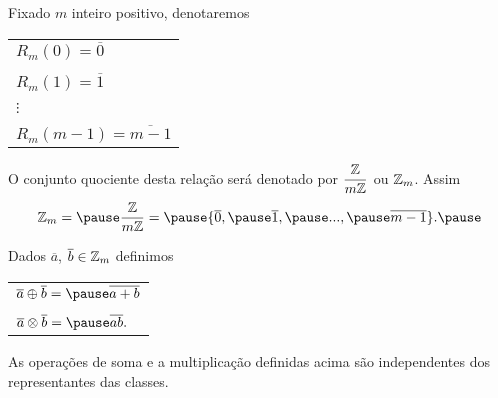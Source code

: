 \documentclass{beamer}
\begin{document}
    \begin{frame}
        \begin{observacao}
        Fixado $m$ inteiro positivo, \pause denotaremos\pause
        \begin{center}
            \begin{tabular}{l}
                $R_{m}(0) = \overline{0}$\pause \\
                \\
                $R_{m}(1) = \overline{1}$\pause \\
                \\
                $\vdots$\\
                \\
                $R_{m}(m-1) = \overline{m-1}$\pause
            \end{tabular}
        \end{center}

        O conjunto quociente \pause desta relação será denotado por $\displaystyle\frac{\mathbb{Z}}{m\mathbb{Z}}$ \pause ou $\mathbb{Z}_m$. \pause Assim\pause
        \[
            \z_m = \pause \displaystyle\frac{\z}{m\z} = \pause \{\overline{0}, \pause \overline{1}, \pause ..., \pause \overline{m-1}\}.\pause
        \]
        \end{observacao}
    \end{frame}

    \begin{frame}
        \begin{definicao}
            Dados $\overline{a}$, $\overline{b} \in \mathbb{Z}_m$ definimos\pause
            \begin{center}
                \begin{tabular}{l}
                    $\overline{a}\oplus\overline{b} = \pause \overline{a + b}\label{soma_modulo_m}$\pause \\
                    \\
                    $\overline{a}\otimes\overline{b} = \pause \overline{ab}.\label{multiplicacao_modulo_m}$\pause
                \end{tabular}
            \end{center}
        \end{definicao}

        \begin{proposicao}
            As operações de soma \pause e a multiplicação \pause definidas acima são independentes dos representantes das classes.
        \end{proposicao}
    \end{frame}
\end{document}
